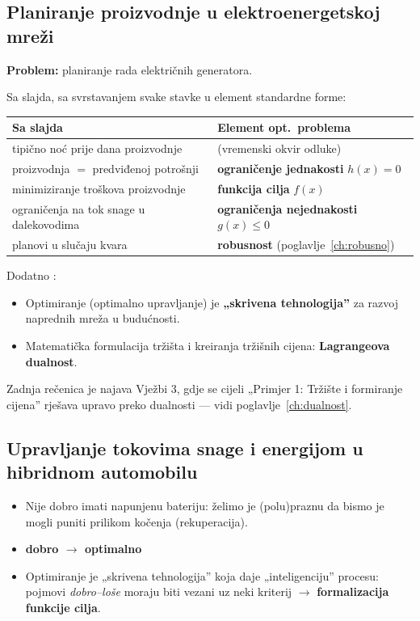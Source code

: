 \subsection{Planiranje proizvodnje u elektroenergetskoj mreži}

\textbf{Problem:} planiranje rada električnih generatora.

Sa slajda, sa svrstavanjem svake stavke u element standardne forme:

\begin{center}
\begin{tabular}{P{7.4cm}P{6.0cm}}
\toprule
\textbf{Sa slajda} & \textbf{Element opt.\ problema} \\
\midrule
tipično noć prije dana proizvodnje & (vremenski okvir odluke) \\
proizvodnja $=$ predviđenoj potrošnji & \textbf{ograničenje jednakosti} $h(x)=0$ \\
minimiziranje troškova proizvodnje & \textbf{funkcija cilja} $f(x)$ \\
ograničenja na tok snage u dalekovodima & \textbf{ograničenja nejednakosti} $g(x)\le 0$ \\
planovi u slučaju kvara & \textbf{robusnost} (poglavlje~\ref{ch:robusno}) \\
\bottomrule
\end{tabular}
\end{center}

Dodatno :
\begin{itemize}
  \item Optimiranje (optimalno upravljanje) je \textbf{„skrivena tehnologija”}
        za razvoj naprednih mreža u budućnosti.
  \item Matematička formulacija tržišta i kreiranja tržišnih cijena:
        \textbf{Lagrangeova dualnost}.
\end{itemize}

Zadnja rečenica je najava Vježbi 3, gdje se cijeli „Primjer 1: Tržište i
formiranje cijena” rješava upravo preko dualnosti --- vidi
poglavlje~\ref{ch:dualnost}.

\subsection{Upravljanje tokovima snage i energijom u hibridnom automobilu}

\begin{itemize}
  \item Nije dobro imati napunjenu bateriju: želimo je (polu)praznu da bismo je
        mogli puniti prilikom kočenja (rekuperacija).
  \item \textbf{dobro $\to$ optimalno}
  \item Optimiranje je „skrivena tehnologija” koja daje „inteligenciju”
        procesu: pojmovi \emph{dobro--loše} moraju biti vezani uz neki kriterij
        $\to$ \textbf{formalizacija funkcije cilja}.
\end{itemize}

